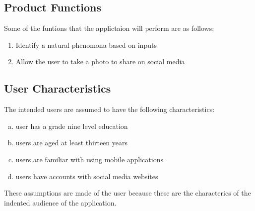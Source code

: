 \documentclass[]{article}
\begin{document}
\subsection{Product Functions}
\label{sub:product_functions}
Some of the funtions that the applictaion will perform are as follows;
\begin{enumerate}
\item Identify a natural phenomona based on inputs
\item Allow the user to take a photo to share on social media
\end{enumerate}

\subsection{User Characteristics}
\label{sub:user_characteristics}
The intended users are assumed to have the following characteristics:
\begin{enumerate}[a)]
	\item user has a grade nine level education
	\item users are aged at least thirteen years
	\item users are familiar with using mobile applications
	\item users have accounts with social media websites 
	  
\end{enumerate}
These assumptions are made of the user because these are the characterics of the indented audience of the application. 
\end{document}
